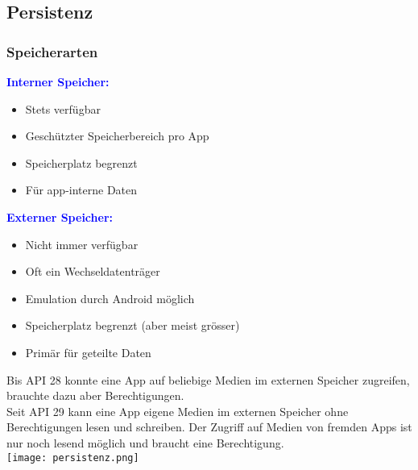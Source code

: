 \subsection{Persistenz}
\subsubsection{Speicherarten}
\textbf{\textcolor{blue}{Interner Speicher:}}
\begin{itemize}[topsep=0pt, leftmargin=4mm]
    \setlength\itemsep{-0.3em}
    \item Stets verfügbar
    \item Geschützter Speicherbereich pro App
    \item Speicherplatz begrenzt
    \item Für app-interne Daten
\end{itemize}
\textbf{\textcolor{blue}{Externer Speicher:}}
\begin{itemize}[topsep=0pt, leftmargin=4mm]
    \setlength\itemsep{-0.3em}
    \item Nicht immer verfügbar
    \item Oft ein Wechseldatenträger
    \item Emulation durch Android möglich
    \item Speicherplatz begrenzt (aber meist grösser)
    \item Primär für geteilte Daten
\end{itemize}
Bis API 28 konnte eine App auf beliebige Medien im externen Speicher zugreifen, brauchte dazu aber Berechtigungen.\\
Seit API 29 kann eine App eigene Medien im externen Speicher ohne Berechtigungen lesen und
schreiben. Der Zugriff auf Medien von fremden Apps ist nur noch lesend möglich und braucht eine Berechtigung.\\
\texttt{[image: persistenz.png]}
